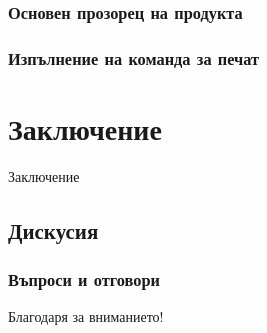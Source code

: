 \documentclass{beamer}
\begin{document}
\begin{frame}
\frametitle{Основен прозорец на продукта}
\end{frame}

\begin{frame}
\frametitle{Изпълнение на команда за печат}
\end{frame}

\section{Заключение}

\begin{frame}
\center \huge{Заключение}
\end{frame}

\subsection{Дискусия}

\begin{frame}
\frametitle{Въпроси и отговори}
\center \huge{Благодаря за вниманието!}
\end{frame}
\end{document}

